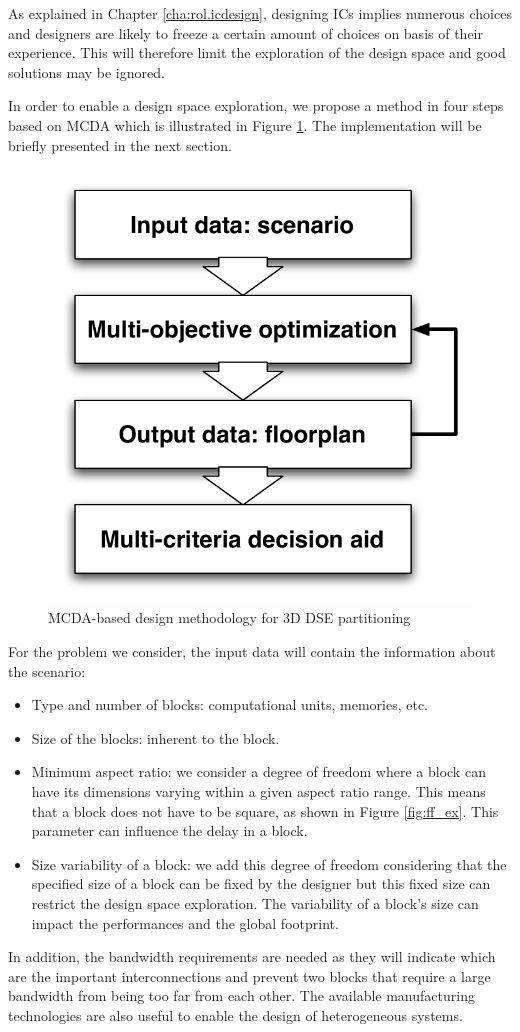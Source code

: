 As explained in Chapter \ref{cha:rol.icdesign}, designing ICs implies numerous choices and designers are likely to freeze a certain amount of choices on basis of their experience. This will therefore limit the exploration of the design space and good solutions may be ignored.

In order to enable a design space exploration, we propose a method in four steps based on MCDA which is illustrated in Figure \ref{fig:mcdaflow}. The implementation will be briefly presented in the next section.

\begin{figure}[h!]
\begin{center}
\includegraphics[width=0.5\linewidth]{MCDA_Method.pdf}
\end{center}
\vspace{-0.5cm}
\caption{MCDA-based design methodology for 3D DSE partitioning}
\label{fig:mcdaflow}
\end{figure}

For the problem we consider, the input data will contain the information about the scenario:
\begin{itemize}
\item Type and number of blocks: computational units, memories, etc.
\item Size of the blocks: inherent to the block.
\item Minimum aspect ratio: we consider a degree of freedom where a block can have its dimensions varying within a given aspect ratio range. This means that a block does not have to be square, as shown in Figure \ref{fig:ff_ex}. This parameter can influence the delay in a block.
\item Size variability of a block: we add this degree of freedom considering that the specified size of a block can be fixed by the designer but this fixed size can restrict the design space exploration. The variability of a block's size can impact the performances and the global footprint.
\end{itemize}
In addition, the bandwidth requirements are needed as they will indicate which are the important interconnections and prevent two blocks that require a large bandwidth from being too far from each other. The available manufacturing technologies are also useful to enable the design of heterogeneous systems.

